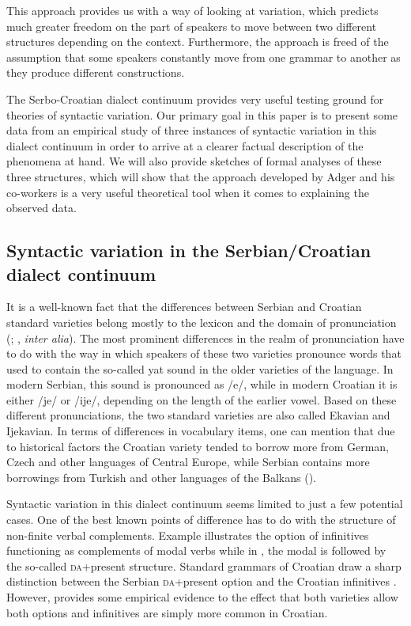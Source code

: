 \documentclass[output=paper,
modfonts,
newtxmath,
hidelinks,
]{langscibook}
\begin{document}
This approach provides us with a way of looking at variation, which predicts much greater freedom on the part of speakers to move between two different structures depending on the context. Furthermore, the approach is freed of the assumption that some speakers constantly move from one grammar to another as they produce different constructions.

The Serbo-Croatian dialect continuum provides very useful testing ground for theories of syntactic variation. Our primary goal in this paper is to present some data from an empirical study of three instances of syntactic variation in this dialect continuum in order to arrive at a clearer factual description of the phenomena at hand. We will also provide sketches of formal analyses of these three structures, which will show that the approach developed by Adger and his co-workers is a very useful theoretical tool when it comes to explaining the observed data.

\subsection{Syntactic variation in the Serbian/Croatian dialect continuum}\label{s1.2}

It is a well-known fact that the differences between Serbian and Croatian standard varieties belong mostly to the lexicon and the domain of pronunciation (\citealt{CorbettBrowne2009}; \citealt{Bailyn2010}, \textit{inter alia}). The most prominent differences in the realm of pronunciation have to do with the way in which speakers of these two varieties pronounce words that used to contain the so-called yat sound in the older varieties of the language. In modern Serbian, this sound is pronounced as /e/, while in modern Croatian it is either /je/ or /ije/, depending on the length of the earlier vowel. Based on these different pronunciations, the two standard varieties are also called Ekavian and Ijekavian. In terms of differences in vocabulary items, one can mention that due to historical factors the Croatian variety tended to borrow more from German, Czech and other languages of Central Europe, while Serbian contains more borrowings from Turkish and other languages of the Balkans (\citealt{CorbettBrowne2009}).

Syntactic variation in this dialect continuum seems limited to just a few potential cases. One of the best known points of difference has to do with the structure of non-finite verbal complements. Example  illustrates the option of infinitives functioning as complements of modal verbs while in , the modal is followed by the so-called \textsc{da}+present structure. Standard grammars of Croatian draw a sharp distinction between the Serbian \textsc{da}+present option and the Croatian infinitives \citep{Katicic}. However, \citet{Bailyn2010} provides some empirical evidence to the effect that both varieties allow both options and infinitives are simply more common in Croatian.
\end{document}
